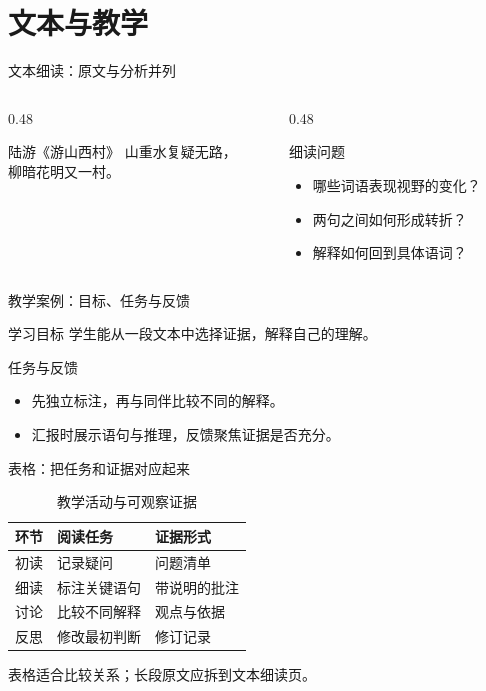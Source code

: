 \documentclass[aspectratio=169]{ctexbeamer}
\begin{document}
\section{文本与教学}
\begin{frame}{文本细读：原文与分析并列}
  \begin{columns}[T,onlytextwidth]
    \begin{column}{0.48\textwidth}
      \begin{HUASquotation}{陆游《游山西村》}
        山重水复疑无路，\\柳暗花明又一村。
      \end{HUASquotation}
    \end{column}
    \begin{column}{0.48\textwidth}
      \begin{block}{细读问题}
        \begin{itemize}
          \item 哪些词语表现视野的变化？
          \item 两句之间如何形成转折？
          \item 解释如何回到具体语词？
        \end{itemize}
      \end{block}
    \end{column}
  \end{columns}
\end{frame}
\begin{frame}{教学案例：目标、任务与反馈}
  \begin{block}{学习目标}
    学生能从一段文本中选择证据，解释自己的理解。
  \end{block}
  \begin{exampleblock}{任务与反馈}
    \begin{itemize}
      \item 先独立标注，再与同伴比较不同的解释。
      \item 汇报时展示语句与推理，反馈聚焦证据是否充分。
    \end{itemize}
  \end{exampleblock}
\end{frame}
\begin{frame}{表格：把任务和证据对应起来}
  \begin{table}
    \caption{教学活动与可观察证据}
    \renewcommand{\arraystretch}{1.4}
    \begin{tabular}{lll}
      \hline
      \textbf{环节} & \textbf{阅读任务} & \textbf{证据形式} \\
      \hline
      初读 & 记录疑问 & 问题清单 \\
      细读 & 标注关键语句 & 带说明的批注 \\
      讨论 & 比较不同解释 & 观点与依据 \\
      反思 & 修改最初判断 & 修订记录 \\
      \hline
    \end{tabular}
  \end{table}
  \medskip
  表格适合比较关系；长段原文应拆到文本细读页。
\end{frame}
\end{document}
